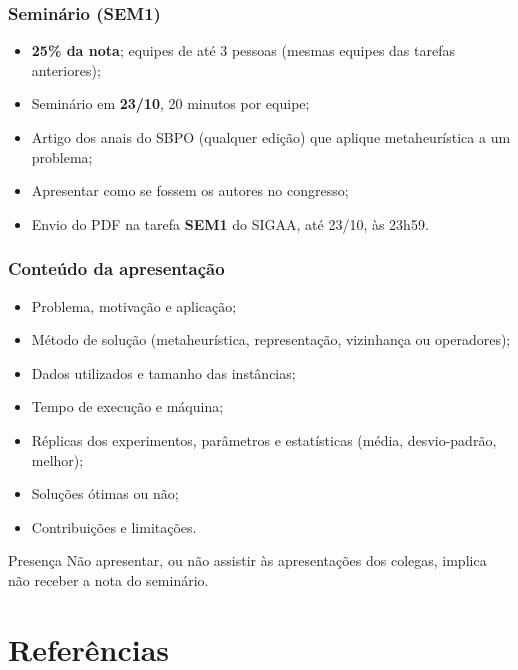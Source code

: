 \documentclass[fleqn]{beamer}
\begin{document}
\begin{frame}
	\frametitle{Seminário (SEM1)}
	\begin{itemize}
		\item \textbf{25\% da nota}; equipes de até 3 pessoas (mesmas
			equipes das tarefas anteriores);
		\item Seminário em \textbf{23/10}, 20 minutos por equipe;
		\item Artigo dos anais do SBPO (qualquer edição) que aplique
			metaheurística a um problema;
		\item Apresentar como se fossem os autores no congresso;
		\item Envio do PDF na tarefa \textbf{SEM1} do SIGAA, até
			23/10, às 23h59.
	\end{itemize}
\end{frame}

\begin{frame}
	\frametitle{Conteúdo da apresentação}
	\begin{itemize}
		\item Problema, motivação e aplicação;
		\item Método de solução (metaheurística, representação,
			vizinhança ou operadores);
		\item Dados utilizados e tamanho das instâncias;
		\item Tempo de execução e máquina;
		\item Réplicas dos experimentos, parâmetros e estatísticas
			(média, desvio-padrão, melhor);
		\item Soluções ótimas ou não;
		\item Contribuições e limitações.
	\end{itemize}
	\vspace{2mm}
	\begin{alertblock}{Presença}
		Não apresentar, ou não assistir às apresentações dos colegas,
		implica não receber a nota do seminário.
	\end{alertblock}
\end{frame}

\section{Referências}
\end{document}
